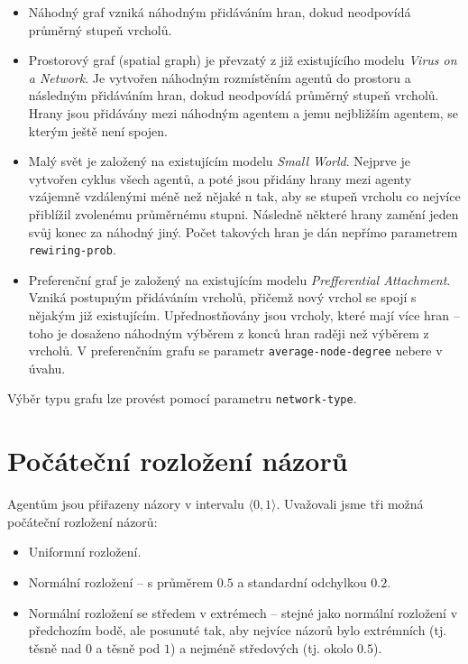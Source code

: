 \documentclass[10pt,a4paper]{report}
\begin{document}
\begin{itemize}
	\item Náhodný graf vzniká náhodným přidáváním hran, dokud neodpovídá prů\-měr\-ný stupeň vrcholů.
	\item Prostorový graf (spatial graph) je převzatý z již existujícího modelu \textit{Virus on a Network}. Je vytvořen náhodným rozmístěním agentů do prostoru a následným přidáváním hran, dokud neodpovídá průměrný stupeň vrcholů. Hrany jsou přidávány mezi náhodným agentem a jemu nejbližším agentem, se kterým ještě není spojen.
	\item Malý svět je založený na existujícím modelu \textit{Small World}. Nejprve je vytvořen cyklus všech agentů, a poté jsou přidány hrany mezi agenty vzájemně vzdálenými méně než nějaké n tak, aby se stupeň vrcholu co nejvíce přiblížil zvolenému průměrnému stupni. Následně některé hrany zamění jeden svůj konec za náhodný jiný. Počet takových hran je dán nepřímo parametrem \texttt{rewiring-prob}.
	\item Preferenční graf je založený na existujícím modelu \textit{Prefferential Attachment}. Vzniká postupným přidáváním vrcholů, přičemž nový vrchol se spojí s nějakým již existujícím. Upřednostňovány jsou vrcholy, které mají více hran -- toho je dosaženo náhodným výběrem z konců hran raději než výběrem z vrcholů. V preferenčním grafu se parametr \texttt{average\--node\--degree} nebere v úvahu.
\end{itemize}

Výběr typu grafu lze provést pomocí parametru \texttt{network-type}.

\section{Počáteční rozložení názorů}
Agentům jsou přiřazeny názory v intervalu $\langle 0, 1 \rangle$. Uvažovali jsme tři možná počáteční rozložení názorů:

\begin{itemize}
	\item Uniformní rozložení.
	\item Normální rozložení -- s průměrem $0.5$ a standardní odchylkou $0.2$.
	\item Normální rozložení se středem v extrémech -- stejné jako normální rozložení v předchozím bodě, ale posunuté tak, aby nejvíce názorů bylo extrémních (tj. těsně nad $0$ a těsně pod $1$) a nejméně středových (tj. okolo $0.5$).
\end{itemize}
\end{document}
